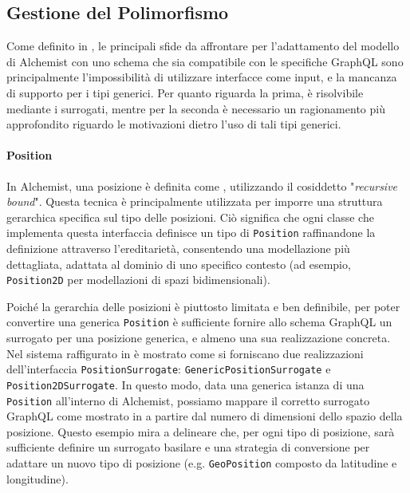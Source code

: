 
\subsection{Gestione del Polimorfismo}\label{ssec:generics-serialize}
Come definito in , le principali sfide da affrontare per l'adattamento del modello di Alchemist con uno schema che sia
compatibile con le specifiche GraphQL sono principalmente l'impossibilità di utilizzare interfacce come input, e la mancanza di supporto per i tipi generici.
Per quanto riguarda la prima, è risolvibile mediante i surrogati, mentre per la seconda è necessario un ragionamento più approfondito riguardo le motivazioni
dietro l'uso di tali tipi generici.

\paragraph{Position}
In Alchemist, una posizione è definita come , utilizzando il cosiddetto "\textit{recursive bound}". Questa tecnica è
principalmente utilizzata per imporre una struttura gerarchica specifica sul tipo delle posizioni. Ciò significa che ogni classe che implementa questa
interfaccia definisce un tipo di \texttt{Position} raffinandone la definizione attraverso l'ereditarietà, consentendo una modellazione più dettagliata,
adattata al dominio di uno specifico contesto (ad esempio, \texttt{Position2D} per modellazioni di spazi bidimensionali).

Poiché la gerarchia delle posizioni è piuttosto limitata e ben definibile, per poter convertire una generica \texttt{Position} è sufficiente fornire
allo schema GraphQL un surrogato per una posizione generica, e almeno una sua realizzazione concreta. Nel sistema raffigurato in 
è mostrato come si forniscano due realizzazioni dell'interfaccia \texttt{PositionSurrogate}: \texttt{GenericPositionSurrogate} e \texttt{Position2DSurrogate}.
%
%
In questo modo, data una generica istanza di una \texttt{Position} all'interno di Alchemist, possiamo mappare il corretto surrogato GraphQL come mostrato in 
a partire dal numero di dimensioni dello spazio della posizione. Questo esempio mira a delineare che, per ogni tipo di posizione, sarà sufficiente
definire un surrogato basilare e una strategia di conversione per adattare un nuovo tipo di posizione (e.g. \texttt{GeoPosition} composto
da latitudine e longitudine).

